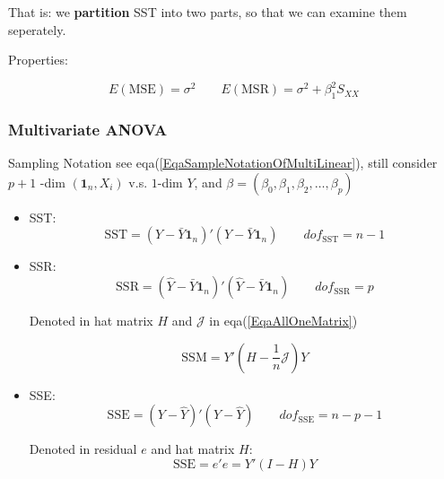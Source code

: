     That is: we \textbf{partition} SST into two parts, so that we can examine them seperately.
    
Properties:
    
\begin{equation}
    E(\mathrm{MSE})=\sigma ^2\qquad E(\mathrm{MSR})=\sigma ^2+\beta _1^2S_{XX} 
\end{equation}


\subsubsection{Multivariate ANOVA}
    Sampling Notation see eqa(\ref{EqaSampleNotationOfMultiLinear}), still consider $ p+1 $ -dim $ (\mathbf{1}_n,X_i) $ v.s. $ 1 $-dim $ Y $, and $ \beta=(\beta _0,\beta _1,\beta _2,\ldots,\beta _p) $

\begin{itemize}[topsep=2pt,itemsep=2pt]
    \item SST:
    \begin{equation}
        \mathrm{SST}=(Y-\bar{Y}\mathbf{1}_n)'(Y-\bar{Y}\mathbf{1}_n)\qquad dof_{\mathrm{SST}}=n-1
    \end{equation}
    \item SSR:
    \begin{equation}
         \mathrm{SSR}=(\hat{Y}-\bar{Y}\mathbf{1}_n)'(\hat{Y}-\bar{Y}\mathbf{1}_n)\qquad dof_{\mathrm{SSR}}=p
    \end{equation}

    Denoted in hat matrix $ H $ and $ \mathcal{J} $ in eqa(\ref{EqaAllOneMatrix})
    
    \begin{equation}\label{EqaSSMInMatrixNotation}
        \mathrm{SSM}=Y'(H-\dfrac{1}{n}\mathcal{J})Y 
    \end{equation}
    
    
    \item SSE:
    \begin{equation}
         \mathrm{SSE}=(Y-\hat{Y})'(Y-\hat{Y})\qquad dof_\mathrm{SSE}=n-p-1
    \end{equation}

    Denoted in residual $ e $ and hat matrix $ H $:
    \begin{equation}
        \mathrm{SSE}=e'e=Y'(I-H)Y 
    \end{equation}
    
    
    
\end{itemize}

